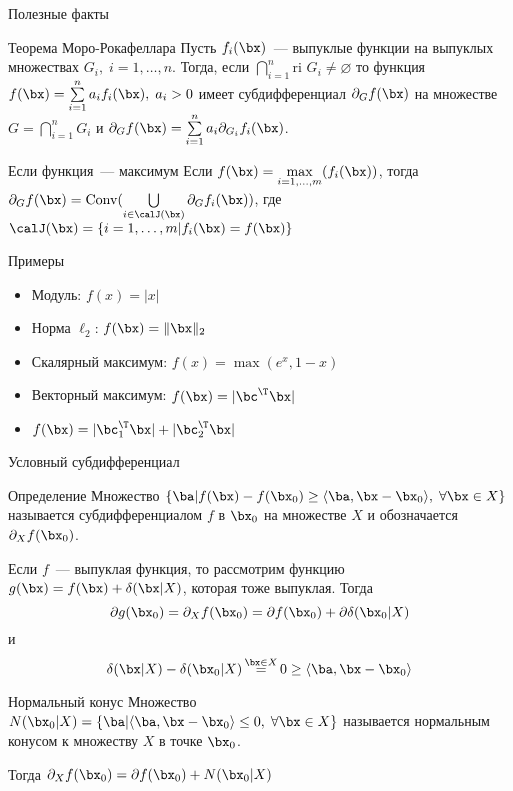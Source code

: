 \documentclass[12pt,russian]{beamer}
\begin{document}
\begin{frame}{Полезные факты}
\begin{block}{Теорема Моро-Рокафеллара}
Пусть $f_i(\bx)$~--- выпуклые функции на выпуклых множествах $G_i, \; i = 1,\ldots,n$. 
Тогда, если $\bigcap\limits_{i=1}^n \text{ri } G_i \neq \varnothing$ то функция $f(\bx) = \sum\limits_{i=1}^n a_i f_i(\bx), \; a_i > 0$ имеет субдифференциал $\partial_G f(\bx)$ на множестве $G = \bigcap\limits_{i=1}^n G_i$ и $\partial_G f(\bx) = \sum\limits_{i=1}^n a_i \partial_{G_i} f_i(\bx)$. 
\end{block}

\begin{block}{Если функция~--- максимум}
Если $f(\bx) = \max\limits_{i=1,\ldots,m}(f_i(\bx))$, тогда $\partial_G f(\bx) = \text{Conv} (\bigcup\limits_{i \in \calJ(\bx)} \partial_G f_i(\bx))$, где $\calJ(\bx) = \{ i = 1,\ldots, m | f_i(\bx) = f(\bx) \}$
\end{block}
\end{frame}

\begin{frame}{Примеры}
\begin{itemize}
\item Модуль: $f(x) = |x|$
\item Норма $\ell_2$: $f(\bx) = \| \bx \|_2$
\item Скалярный максимум: $f(x) = \max(e^x, 1 - x)$
\item Векторный максимум: $f(\bx) = |\bc^{\T}\bx|$
\item $f(\bx) = |\bc^{\T}_1\bx| + |\bc^{\T}_2\bx|$
\end{itemize}
\end{frame}

\begin{frame}{Условный субдифференциал}
\small
\begin{block}{Определение}
Множество 
$
\{ \ba |  f(\bx) - f(\bx_0) \geq \langle \ba, \bx - \bx_0 \rangle, \; \forall \bx \in X \}
$ 
называется субдифференциалом $f$ в $\bx_0$ на множестве $X$ и обозначается $\partial_X f(\bx_0)$.
\end{block}
Если $f$~--- выпуклая функция, то рассмотрим функцию $g(\bx) = f(\bx) + \delta(\bx | X)$, которая тоже выпуклая.
Тогда
\vspace{-2mm} 
\[
\partial g (\bx_0) = \partial_X f(\bx_0) = \partial f(\bx_0) + \partial \delta(\bx_0 | X)
\vspace{-3mm} 
\]
и
\[
\delta(\bx |X) - \delta(\bx_0 |X) \mathop{=}\limits^{\bx \in X} 0 \geq \langle \ba, \bx - \bx_0 \rangle
\vspace{-3mm}
\]
\begin{block}{Нормальный конус}
Множество $N(\bx_0 | X) = \{ \ba | \langle \ba, \bx - \bx_0 \rangle \leq 0, \; \forall \bx \in X \}$ называется нормальным конусом к множеству $X$ в точке $\bx_0$.
\end{block}
Тогда $\partial_X f(\bx_0) = \partial f(\bx_0) + N(\bx_0 | X)$  
\end{frame}
\end{document}

